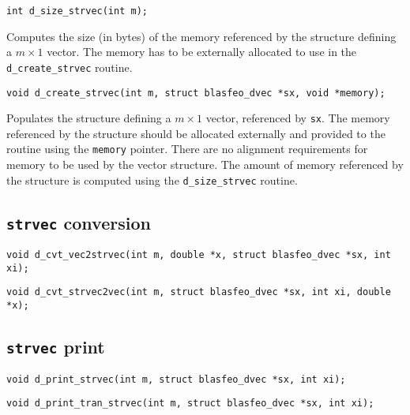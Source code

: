 \documentclass[a4paper]{report}
\begin{document}
\begin{verbatim}
int d_size_strvec(int m);
\end{verbatim}
Computes the size (in bytes) of the memory referenced by the structure defining a $m\times 1$ vector.
The memory has to be externally allocated to use in the {\tt d\_create\_strvec} routine.

\begin{verbatim}
void d_create_strvec(int m, struct blasfeo_dvec *sx, void *memory);
\end{verbatim}
Populates the structure defining a $m\times 1$ vector, referenced by {\tt sx}.
The memory referenced by the structure should be allocated externally and provided to the routine using the {\tt memory} pointer.
There are no alignment requirements for memory to be used by the vector structure. %
The amount of memory referenced by the structure is computed using the {\tt d\_size\_strvec} routine.



\subsection{{\tt strvec} conversion}

\begin{verbatim}
void d_cvt_vec2strvec(int m, double *x, struct blasfeo_dvec *sx, int xi);
\end{verbatim}

\begin{verbatim}
void d_cvt_strvec2vec(int m, struct blasfeo_dvec *sx, int xi, double *x);
\end{verbatim}



\subsection{{\tt strvec} print}

\begin{verbatim}
void d_print_strvec(int m, struct blasfeo_dvec *sx, int xi);
\end{verbatim}

\begin{verbatim}
void d_print_tran_strvec(int m, struct blasfeo_dvec *sx, int xi);
\end{verbatim}
\end{document}
